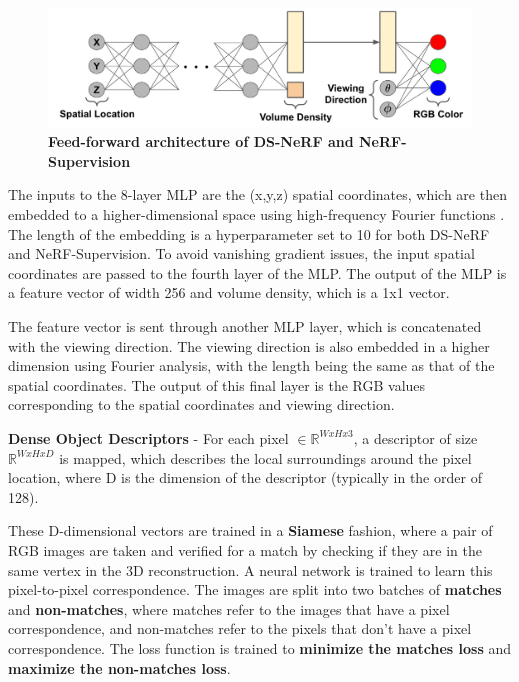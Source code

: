 \documentclass[conference]{IEEEtran}
\begin{document}
\begin{figure} [h]
\centering
     \includegraphics[scale = 0.15]{figures/Method/Nerf_architecture.jpg}
     \caption{\label{fig:Nerf_Architecture} \textbf{Feed-forward architecture of DS-NeRF and NeRF-Supervision}}
\end{figure}

The inputs to the 8-layer MLP are the (x,y,z) spatial coordinates, which are then embedded to a higher-dimensional space using high-frequency Fourier functions \cite{tancik2020fourier}. The length of the embedding is a hyperparameter set to 10 for both DS-NeRF and NeRF-Supervision. To avoid vanishing gradient issues, the input spatial coordinates are passed to the fourth layer of the MLP. The output of the MLP is a feature vector of width 256 and volume density, which is a 1x1 vector.
\vspace{2mm}

The feature vector is sent through another MLP layer, which is concatenated with the viewing direction. The viewing direction is also embedded in a higher dimension using Fourier analysis, with the length being the same as that of the spatial coordinates. The output of this final layer is the RGB values corresponding to the spatial coordinates and viewing direction.
\vspace{2mm}

\textbf{Dense Object Descriptors} -  For each pixel $\in \mathbb{R}^{W x H x 3}$, a descriptor of size $\mathbb{R}^{W x H x D}$ is mapped, which describes the local surroundings around the pixel location, where D is the dimension of the descriptor (typically in the order of 128).

These D-dimensional vectors are trained in a \textbf{Siamese} fashion, where a pair of RGB images are taken and verified for a match by checking if they are in the same vertex in the 3D reconstruction. A neural network is trained to learn this pixel-to-pixel correspondence. The images are split into two batches of \textbf{matches} and \textbf{non-matches}, where matches refer to the images that have a pixel correspondence, and non-matches refer to the pixels that don't have a pixel correspondence. The loss function is trained to \textbf{minimize the matches loss} and \textbf{maximize the non-matches loss}. \vspace{2mm}
\end{document}
